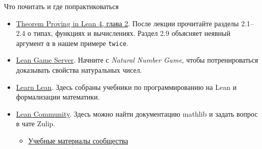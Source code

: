 \documentclass[aspectratio=169]{beamer}
\begin{document}
\begin{frame}{Что почитать и где попрактиковаться}
\begin{itemize}
\item \href{https://lean-lang.org/theorem_proving_in_lean4/Dependent-Type-Theory/}{Theorem Proving in Lean 4, глава 2}. После лекции прочитайте разделы 2.1–2.4 о типах, функциях и вычислениях. Раздел 2.9 объясняет неявный аргумент \texttt{α} в нашем примере \texttt{twice}.
\item \href{https://adam.math.hhu.de/}{Lean Game Server}. Начните с \textit{Natural Number Game}, чтобы потренироваться доказывать свойства натуральных чисел.
\item \href{https://lean-lang.org/learn/}{Learn Lean}. Здесь собраны учебники по программированию на Lean и формализации математики.
\item \href{https://leanprover-community.github.io/}{Lean Community}. Здесь можно найти документацию mathlib и задать вопрос в чате Zulip.
\begin{itemize}
\item \href{https://leanprover-community.github.io/learn.html}{Учебные материалы сообщества}
\end{itemize}
\end{itemize}
\end{frame}
\end{document}
